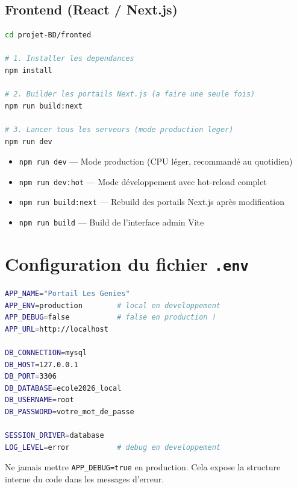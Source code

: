 \documentclass[12pt,a4paper]{report}
\begin{document}
\subsection{Frontend (React / Next.js)}
\begin{lstlisting}[language=bash]
cd projet-BD/fronted

# 1. Installer les dependances
npm install

# 2. Builder les portails Next.js (a faire une seule fois)
npm run build:next

# 3. Lancer tous les serveurs (mode production leger)
npm run dev
\end{lstlisting}

\begin{infobox}
\begin{itemize}[leftmargin=*,noitemsep]
  \item \texttt{npm run dev} — Mode production (CPU léger, recommandé au quotidien)
  \item \texttt{npm run dev:hot} — Mode développement avec hot-reload complet
  \item \texttt{npm run build:next} — Rebuild des portails Next.js après modification
  \item \texttt{npm run build} — Build de l'interface admin Vite
\end{itemize}
\end{infobox}

\section{Configuration du fichier \texttt{.env}}

\begin{lstlisting}[language=bash]
APP_NAME="Portail Les Genies"
APP_ENV=production        # local en developpement
APP_DEBUG=false           # false en production !
APP_URL=http://localhost

DB_CONNECTION=mysql
DB_HOST=127.0.0.1
DB_PORT=3306
DB_DATABASE=ecole2026_local
DB_USERNAME=root
DB_PASSWORD=votre_mot_de_passe

SESSION_DRIVER=database
LOG_LEVEL=error           # debug en developpement
\end{lstlisting}

\begin{dangerbox}[Sécurité]
Ne jamais mettre \texttt{APP\_DEBUG=true} en production. Cela expose la structure interne du code dans les messages d'erreur.
\end{dangerbox}
\end{document}
